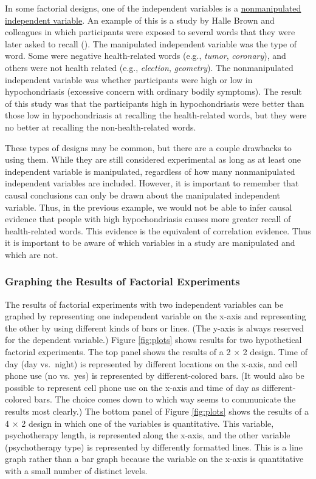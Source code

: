 \documentclass[
]{krantz}
\begin{document}
In some factorial designs, one of the independent variables is a \hyperref[nonmanipulated-independent-variable]{nonmanipulated independent variable}. An example of this is a study by Halle Brown and colleagues in which participants were exposed to several words that they were later asked to recall (). The manipulated independent variable was the type of word. Some were negative health-related words (e.g., \emph{tumor}, \emph{coronary}), and others were not health related (e.g., \emph{election}, \emph{geometry}). The nonmanipulated independent variable was whether participants were high or low in hypochondriasis (excessive concern with ordinary bodily symptoms). The result of this study was that the participants high in hypochondriasis were better than those low in hypochondriasis at recalling the health-related words, but they were no better at recalling the non-health-related words.

These types of designs may be common, but there are a couple drawbacks to using them. While they are still considered experimental as long as at least one independent variable is manipulated, regardless of how many nonmanipulated independent variables are included. However, it is important to remember that causal conclusions can only be drawn about the manipulated independent variable. Thus, in the previous example, we would not be able to infer causal evidence that people with high hypochondriasis causes more greater recall of health-related words. This evidence is the equivalent of correlation evidence. Thus it is important to be aware of which variables in a study are manipulated and which are not.

\subsubsection*{Graphing the Results of Factorial Experiments}\label{graphing-the-results-of-factorial-experiments}


The results of factorial experiments with two independent variables can be graphed by representing one independent variable on the x-axis and representing the other by using different kinds of bars or lines. (The y-axis is always reserved for the dependent variable.) Figure \ref{fig:plots} shows results for two hypothetical factorial experiments. The top panel shows the results of a 2 × 2 design. Time of day (day vs.~night) is represented by different locations on the x-axis, and cell phone use (no vs.~yes) is represented by different-colored bars. (It would also be possible to represent cell phone use on the x-axis and time of day as different-colored bars. The choice comes down to which way seems to communicate the results most clearly.) The bottom panel of Figure \ref{fig:plots} shows the results of a 4 × 2 design in which one of the variables is quantitative. This variable, psychotherapy length, is represented along the x-axis, and the other variable (psychotherapy type) is represented by differently formatted lines. This is a line graph rather than a bar graph because the variable on the x-axis is quantitative with a small number of distinct levels.
\end{document}
